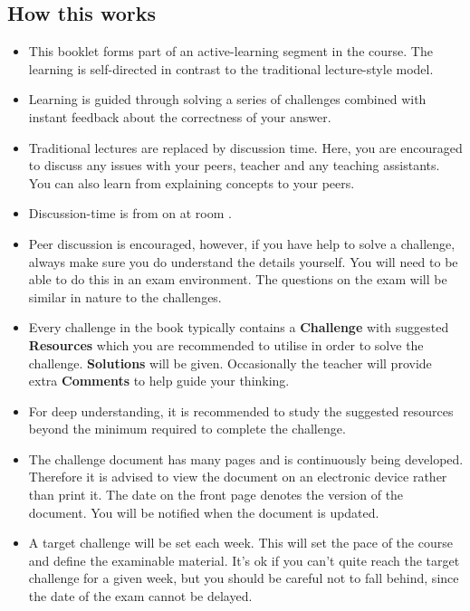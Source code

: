 \subsection{How this works}
\begin{itemize}
    \item This booklet forms part of an active-learning segment in the course. The learning is self-directed in contrast to the traditional lecture-style model.
    \item Learning is guided through solving a series of challenges combined with instant feedback about the correctness of your answer.
    \item Traditional lectures are replaced by discussion time. Here, you are encouraged to discuss any issues with your peers, teacher and any teaching assistants. You can also learn from explaining concepts to your peers.
    \item Discussion-time is from \disctime on \discdays at room \discroom.
    \item Peer discussion is encouraged, however, if you have help to solve a challenge, always make sure you do understand the details yourself. You will need to be able to do this in an exam environment. The questions on the exam will be similar in nature to the challenges.
    \item Every challenge in the book typically contains a \textbf{Challenge} with suggested \textbf{Resources} which you are recommended to utilise in order to solve the challenge. \textbf{Solutions} will be given. Occasionally the teacher will provide extra \textbf{Comments} to help guide your thinking.
    \item For deep understanding, it is recommended to study the suggested resources beyond the minimum required to complete the challenge.
    \item The challenge document has many pages and is continuously being developed. Therefore it is advised to view the document on an electronic device rather than print it. The date on the front page denotes the version of the document. You will be notified when the document is updated.
    \item A target challenge will be set each week. This will set the pace of the course and define the examinable material. It's ok if you can't quite reach the target challenge for a given week, but you should be careful not to fall behind, since the date of the exam cannot be delayed.
\end{itemize}

